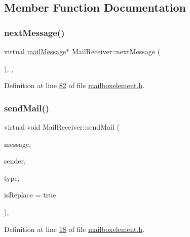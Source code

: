 \subsection{Member Function Documentation}
\mbox{\label{a00197_a127a70ec582190f90979cb72b8cba72c}} 
\subsubsection{\texorpdfstring{next\+Message()}{nextMessage()}}
{\footnotesize\ttfamily virtual \hyperlink{a00201}{mail\+Message}$\ast$ Mail\+Receiver\+::next\+Message (\begin{DoxyParamCaption}{ }\end{DoxyParamCaption})\hspace{0.3cm}{\ttfamily [inline]}, {\ttfamily [protected]}, {\ttfamily [virtual]}}



Definition at line \hyperlink{a00002_source_l00082}{82} of file \hyperlink{a00002_source}{mailboxelement.\+h}.

\mbox{\label{a00197_a0efada2a49e9a841430a8b6f71b6803d}} 
\subsubsection{\texorpdfstring{send\+Mail()}{sendMail()}}
{\footnotesize\ttfamily virtual void Mail\+Receiver\+::send\+Mail (\begin{DoxyParamCaption}\item[{\hyperlink{a00121}{Message\+For\+Server} $\ast$}]{message,  }\item[{\hyperlink{a00205}{Mail\+Sender} $\ast$}]{sender,  }\item[{int}]{type,  }\item[{bool}]{is\+Replace = {\ttfamily true} }\end{DoxyParamCaption})\hspace{0.3cm}{\ttfamily [inline]}, {\ttfamily [virtual]}}



Definition at line \hyperlink{a00002_source_l00018}{18} of file \hyperlink{a00002_source}{mailboxelement.\+h}.



